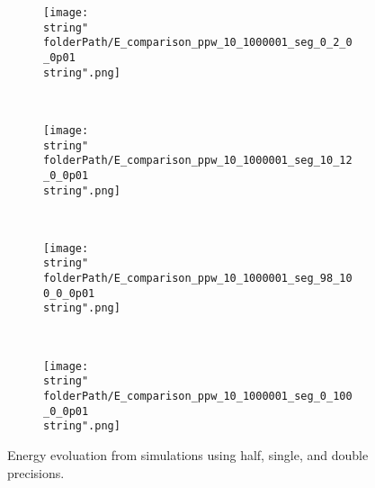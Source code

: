 \begin{figure}[H]
\captionsetup{width=0.95\textwidth,font=footnotesize,labelfont=footnotesize}
\centering
%
\begin{subfigure}[b]{1\textwidth}
%
\centering\texttt{[image: \\string"\\folderPath/E\_comparison\_ppw\_10\_1000001\_seg\_0\_2\_0\_0p01\\string".png]}
%
\end{subfigure}\hfill
\\[2ex]
%
\begin{subfigure}[b]{1\textwidth}
%
\centering\texttt{[image: \\string"\\folderPath/E\_comparison\_ppw\_10\_1000001\_seg\_10\_12\_0\_0p01\\string".png]}
%
\end{subfigure}\hfill
\\[2ex]
%
\begin{subfigure}[b]{1\textwidth}
%
\centering\texttt{[image: \\string"\\folderPath/E\_comparison\_ppw\_10\_1000001\_seg\_98\_100\_0\_0p01\\string".png]}
%
\end{subfigure}\hfill
\\[2ex]
%
\begin{subfigure}[b]{1\textwidth}
%
\centering\texttt{[image: \\string"\\folderPath/E\_comparison\_ppw\_10\_1000001\_seg\_0\_100\_0\_0p01\\string".png]}
%
\end{subfigure}\hfill
%
\caption{Energy evoluation from simulations using half, single, and double precisions.}
\label{comparison_E_half_compensated_single_double_marmousi2_0_0p01_naive}
\end{figure}

\renewcommand{\folderPath}{\string"/dev/null\string"}